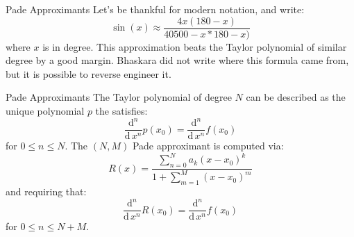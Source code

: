 \documentclass{beamer}
\begin{document}
    \begin{frame}{Pade Approximants}
        Let's be thankful for modern notation, and write:
        \begin{equation}
            \sin(x)\approx\frac{4x(180-x)}{40500-x*180-x)}
        \end{equation}
        where $x$ is in degree. This approximation beats the Taylor polynomial
        of similar degree by a good margin. Bhaskara did not write where this
        formula came from, but it is possible to reverse engineer it.
    \end{frame}
    \begin{frame}{Pade Approximants}
        The Taylor polynomial of degree $N$ can be described as the unique
        polynomial $p$ the satisfies:
        \begin{equation}
            \frac{\textrm{d}^{n}}{\textrm{d}\,x^n}p(x_{0})=
            \frac{\textrm{d}^{n}}{\textrm{d}\,x^n}f(x_{0})
        \end{equation}
        for $0\leq{n}\leq{N}$. The $(N,M)$ Pade approximant is computed via:
        \begin{equation}
            R(x)=\frac{\sum_{n=0}^{N}a_{k}(x-x_{0})^{k}}
                {1+\sum_{m=1}^{M}(x-x_{0})^{m}}
        \end{equation}
        and requiring that:
        \begin{equation}
            \frac{\textrm{d}^{n}}{\textrm{d}\,x^n}R(x_{0})=
            \frac{\textrm{d}^{n}}{\textrm{d}\,x^n}f(x_{0})
        \end{equation}
        for $0\leq{n}\leq{N+M}$.
    \end{frame}
\end{document}
